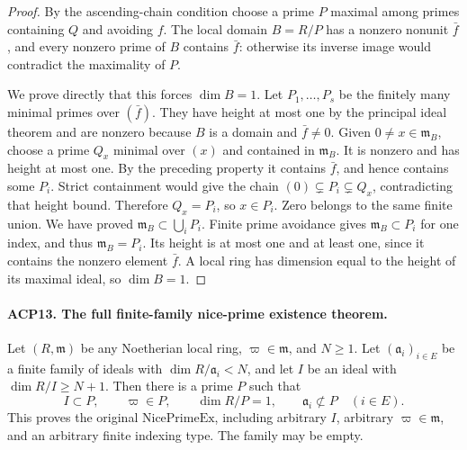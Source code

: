 \begin{proof}
By the ascending-chain condition choose a prime \(P\) maximal
among primes containing \(Q\) and avoiding \(f\).
The local domain \(B=R/P\) has a nonzero nonunit
\(\bar f\), and every nonzero prime of \(B\) contains
\(\bar f\): otherwise its inverse image would contradict
the maximality of \(P\).

We prove directly that this forces \(\dim B=1\).
Let \(P_1,\ldots,P_s\) be the finitely many minimal primes
over \((\bar f)\).  They have height at most one by the
principal ideal theorem and are nonzero because \(B\) is a
domain and \(\bar f\ne0\).
Given \(0\ne x\in\mathfrak m_B\), choose a prime \(Q_x\)
minimal over \((x)\) and contained in \(\mathfrak m_B\).
It is nonzero and has height at most one.  By the preceding
property it contains \(\bar f\), and hence contains some
\(P_i\).  Strict containment would give the chain
\((0)\subsetneq P_i\subsetneq Q_x\), contradicting that
height bound.  Therefore \(Q_x=P_i\), so \(x\in P_i\).
Zero belongs to the same finite union.  We have proved
\(\mathfrak m_B\subset\bigcup_iP_i\).
Finite prime avoidance gives \(\mathfrak m_B\subset P_i\)
for one index, and thus \(\mathfrak m_B=P_i\).
Its height is at most one and at least one, since it contains
the nonzero element \(\bar f\).  A local ring has dimension
equal to the height of its maximal ideal, so \(\dim B=1\).
\end{proof}

\paragraph{ACP13. The full finite-family nice-prime existence theorem.}
\label{claim:ACP13}
Let \((R,\mathfrak m)\) be any Noetherian local ring,
\(\varpi\in\mathfrak m\), and \(N\ge1\).
Let \((\mathfrak a_i)_{i\in E}\) be a finite family of ideals
with \(\dim R/\mathfrak a_i<N\), and let \(I\) be an ideal
with \(\dim R/I\ge N+1\).  Then there is a prime \(P\)
such that
\[
 I\subset P,\qquad \varpi\in P,\qquad \dim R/P=1,
 \qquad \mathfrak a_i\not\subset P\quad(i\in E).
                                                        \tag{ACP.24}
\]
This proves the original \(\mathrm{NicePrimeEx}\), including
arbitrary \(I\), arbitrary \(\varpi\in\mathfrak m\), and an
arbitrary finite indexing type.  The family may be empty.

